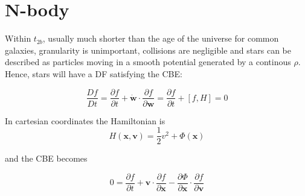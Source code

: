 \section{N-body}

Within $t_{2b}$, usually much shorter than the age of the universe for common galaxies, 
granularity is unimportant, collisions are negligible and stars can be described as
 particles moving in a smooth potential
generated by a continous $\rho$. Hence, stars will have a DF satisfying the CBE: 

\begin{equation}\label{CBE}
    \frac{Df}{Dt}=\frac{\partial f}{\partial t}+
    \mathbf{\dot{w}}\cdot \frac{\partial f}{\partial \mathbf{w}}=
    \frac{\partial f}{\partial t}+[f,H]=0
\end{equation}



In cartesian coordinates the Hamiltonian is
\begin{equation}\label{Hamiltonian in cartesian coord.}
    H(\mathbf{x},\mathbf{v})=\frac{1}{2}v^2+\Phi(\mathbf{x})
\end{equation}

and the CBE becomes

\begin{equation}\label{CBE in cartesian coord.}
    0=\frac{\partial f}{\partial t}+\mathbf{v}\cdot 
    \frac{\partial f}{\partial \mathbf{x}}-
    \frac{\partial \Phi}{\partial \mathbf{x}}
    \cdot \frac{\partial f}{\partial \mathbf{v}}
\end{equation}

